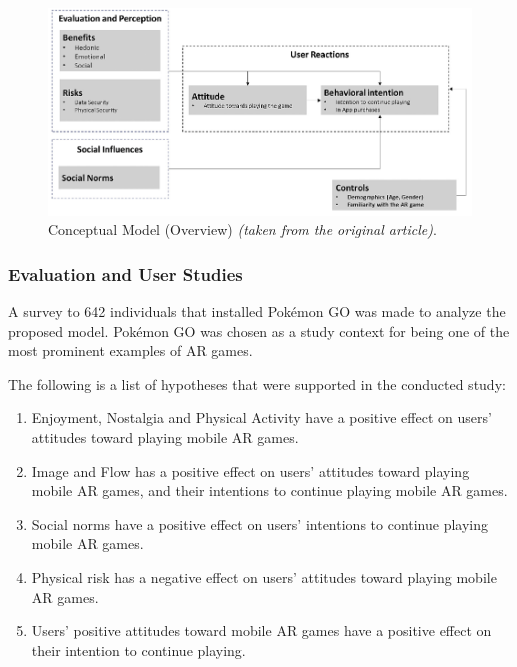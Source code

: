 \documentclass[runningheads]{llncs}
\begin{document}
\begin{figure}
    \centering
    \includegraphics[width=\textwidth]{Screenshot_23.png}
    \caption{Conceptual Model (Overview) \textit{(taken from the original article)}.}
    \label{fig:model}
\end{figure}


\subsubsection{Evaluation and User Studies}
\par A survey to 642 individuals that installed Pokémon GO was made to analyze the proposed model. Pokémon GO was chosen as a study context for being one of the most prominent examples of AR games.
\par The following is a list of hypotheses that were supported in the conducted study:
\begin{enumerate}
    \item Enjoyment, Nostalgia and Physical Activity have a positive effect on users' attitudes toward playing mobile AR games.
    \item Image and Flow has a positive effect on users' attitudes toward playing mobile AR games, and their intentions to continue playing mobile AR games.
    \item Social norms have a positive effect on users' intentions to continue playing mobile AR games.
    \item Physical risk has a negative effect on users' attitudes toward playing mobile AR games.
    \item Users' positive attitudes toward mobile AR games have a positive effect on their intention to continue playing.
\end{enumerate}
\end{document}
